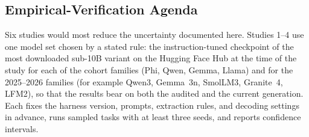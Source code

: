 \subsection{Empirical-Verification Agenda}
\label{subsec:challenges_verification}

Six studies would most reduce the uncertainty documented here. Studies 1--4 use one model set chosen by a stated rule: the instruction-tuned checkpoint of the most downloaded sub-10B variant on the Hugging Face Hub at the time of the study for each of the cohort families (Phi, Qwen, Gemma, Llama) and for the 2025--2026 families (for example Qwen3, Gemma~3n, SmolLM3, Granite~4, LFM2), so that the results bear on both the audited and the current generation. Each fixes the harness version, prompts, extraction rules, and decoding settings in advance, runs sampled tasks with at least three seeds, and reports confidence intervals.


